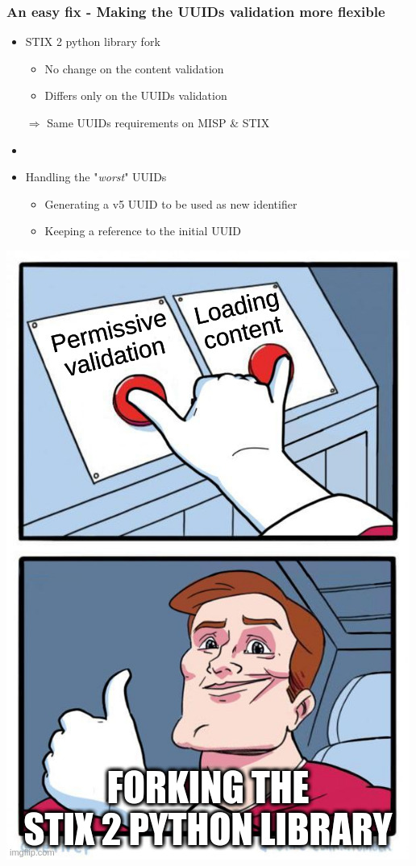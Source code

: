\begin{frame}
    \frametitle{An easy fix - Making the UUIDs validation more flexible}
    \begin{minipage}{0.7\textwidth}
        \begin{itemize}
            \item STIX 2 python library fork\footnotemark[1]
            \begin{itemize}
                \item No change on the content validation
                \item Differs only on the UUIDs validation
            \end{itemize}
            $\Rightarrow$ Same UUIDs requirements on MISP \& STIX
            \item[]
            \item Handling the "\emph{worst}" UUIDs
            \begin{itemize}
                \item Generating a v5 UUID to be used as new identifier
                \item Keeping a reference to the initial UUID
            \end{itemize}
        \end{itemize}
    \end{minipage}%
    \begin{minipage}{0.3\textwidth}
        \includegraphics[scale=0.25]{images/two_buttons_solution.jpg}

\end{minipage}
\end{frame}
